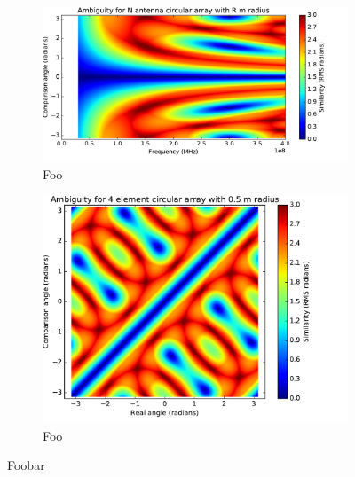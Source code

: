 \begin{figure}
  \begin{subfigure}{\textwidth}
    \centering
    \includegraphics[width=\textwidth, clip=true, trim = 0 15 53 0]{4-element-circular-ambiguity-over-frequency}
    \caption{Foo}
  \end{subfigure}
  \begin{subfigure}{\textwidth}
    \centering
    \includegraphics[width=\textwidth, clip=true, trim = 0 15 53 0]{4-element-circular-ambiguity-vs-phi}
    \caption{Foo}
  \end{subfigure}
  \caption{Foobar}
\end{figure}
